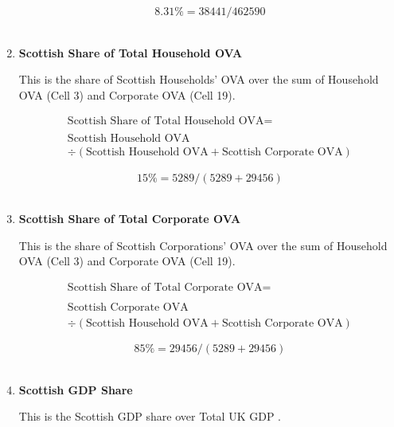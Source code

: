 \begin{enumerate}
\begin{equation} \nonumber
8.31\% = 38441/462590
\end{equation}\\


\item \textbf {Scottish Share of Total Household OVA}

This is the share of Scottish Households' OVA over the sum of Household OVA (Cell 3) and Corporate OVA (Cell 19).

\begin{equation}
\begin{split}
\text{Scottish Share of Total Household OVA} =  \\ \\
\text{Scottish Household OVA}\\ 
\div (\text{Scottish Household OVA}+ \text{Scottish Corporate OVA}) 
\end{split} \label{eq:2.5.83}
\end{equation}

\begin{equation} \nonumber
15\% = 5289/(5289+29456)
\end{equation}\\


\item \textbf {Scottish Share of Total Corporate OVA}

This is the share of Scottish Corporations' OVA over the sum of Household OVA (Cell 3) and Corporate OVA (Cell 19).

\begin{equation}
\begin{split}
\text{Scottish Share of Total Corporate OVA} =  \\ \\
\text{Scottish Corporate OVA}\\ 
\div (\text{Scottish Household OVA}+ \text{Scottish Corporate OVA}) 
\end{split} \label{eq:2.5.84}
\end{equation}

\begin{equation} \nonumber
85\% = 29456/(5289+29456)
\end{equation}\\


\item \textbf {Scottish GDP Share}

This is the Scottish GDP share over Total UK GDP \cite{ScottishGovernment2013a, ONS2011c}.


\end{enumerate}
